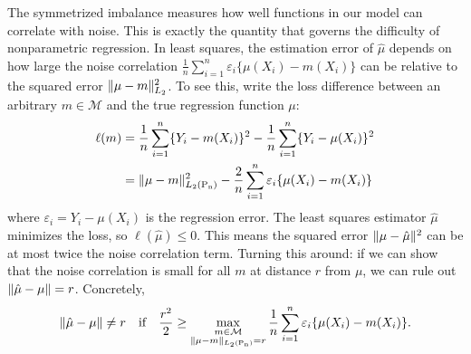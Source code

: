 \documentclass{article}
\DeclarePairedDelimiter\norm{\lVert}{\rVert}
\theoremstyle{definition}
\DeclareMathOperator{\Pn}{P_n}
\newcommand{\model}{\mathcal{M}}
\newcommand{\<}{\langle}
\renewcommand{\>}{\rangle}
\begin{document}
The symmetrized imbalance measures how well functions in our model can correlate with noise. This is exactly the quantity that governs the difficulty of nonparametric regression. In least squares, the estimation error of $\hat\mu$ depends on how large the noise correlation
$\frac{1}{n}\sum_{i=1}^n \varepsilon_i \{ \mu(X_i) - m(X_i) \}$
can be relative to the squared error $\norm{\mu - m}_{L_2}^2$. To see this, write the loss difference between an arbitrary $m \in \model$ and the true regression function $\mu$:
\begin{equation}
\begin{aligned}
\label{eq:loss-difference}
\ell(m)
&=  \frac1n \sum_{i=1}^n \{Y_i - m(X_i) \}^2 - \frac1n\sum_{i=1}^n\{Y_i - \mu(X_i) \}^2 \\
&= \norm{\mu - m}_{L_2(\Pn)}^2 - \frac2n \sum_{i=1}^n \varepsilon_i \{ \mu(X_i)-m(X_i) \}
\end{aligned}
\end{equation}
where $\varepsilon_i = Y_i - \mu(X_i)$ is the regression error. The least squares estimator $\hat\mu$ minimizes the loss, so $\ell(\hat\mu) \le 0$. This means the squared error $\norm{\mu - \hat\mu}^2$ can be at most twice the noise correlation term. Turning this around: if we can show that the noise correlation is small for all $m$ at distance $r$ from $\mu$, we can rule out $\norm{\hat\mu - \mu} = r$. Concretely,
\begin{equation}
\label{eq:least-squares-fixed-point}
\norm{\hat \mu - \mu} \neq r \quad \text{if} \quad
\frac{r^2}{2} \ge  \max_{\substack{m \in \model \\ \norm{\mu - m}_{L_2(\Pn)} = r}} \frac1n\sum_{i=1}^n \varepsilon_i \{ \mu(X_i) - m(X_i) \}.
\end{equation}
\end{document}
